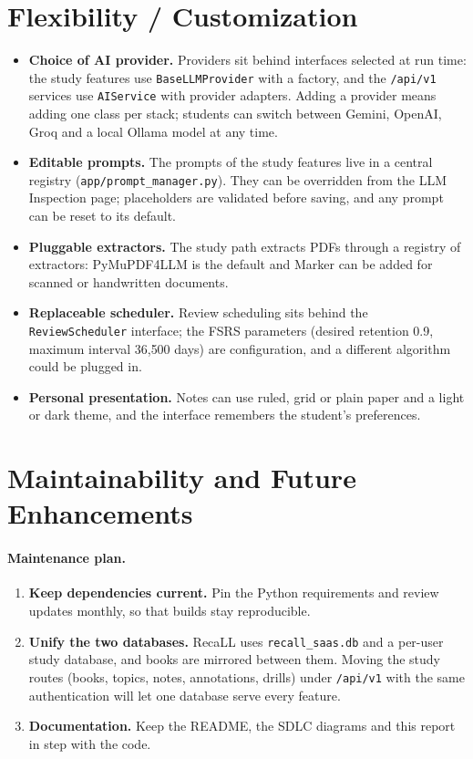 \section{Flexibility / Customization}

\begin{itemize}
  \item \textbf{Choice of AI provider.} Providers sit behind interfaces selected at run time: the study
  features use \texttt{BaseLLMProvider} with a factory, and the \texttt{/api/v1} services use
  \texttt{AIService} with provider adapters. Adding a provider means adding one class per stack;
  students can switch between Gemini, OpenAI, Groq and a local Ollama model at any time.
  \item \textbf{Editable prompts.} The prompts of the study features live in a central registry
  (\texttt{app/prompt\_manager.py}). They can be overridden from the LLM Inspection page; placeholders
  are validated before saving, and any prompt can be reset to its default.
  \item \textbf{Pluggable extractors.} The study path extracts PDFs through a registry of extractors:
  PyMuPDF4LLM is the default and Marker can be added for scanned or handwritten documents.
  \item \textbf{Replaceable scheduler.} Review scheduling sits behind the \texttt{ReviewScheduler}
  interface; the FSRS parameters (desired retention 0.9, maximum interval 36{,}500 days) are
  configuration, and a different algorithm could be plugged in.
  \item \textbf{Personal presentation.} Notes can use ruled, grid or plain paper and a light or dark
  theme, and the interface remembers the student's preferences.
\end{itemize}

\section{Maintainability and Future Enhancements}

\paragraph{Maintenance plan.}
\begin{enumerate}
  \item \textbf{Keep dependencies current.} Pin the Python requirements and review updates monthly, so
  that builds stay reproducible.
  \item \textbf{Unify the two databases.} RecaLL uses \texttt{recall\_saas.db} and a per-user study
  database, and books are mirrored between them. Moving the study routes (books, topics, notes,
  annotations, drills) under \texttt{/api/v1} with the same authentication will let one database serve
  every feature.
  \item \textbf{Documentation.} Keep the README, the SDLC diagrams and this report in step with the code.
\end{enumerate}

